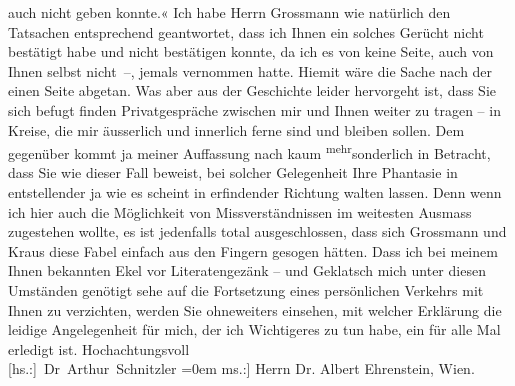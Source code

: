 \begin{ledgroupsized}[t]{13cm}
               auch nicht geben konnte.\introOben{}«\introOben{}\pend
           \pstart
           Ich habe Herrn Grossmann wie natürlich den
               Tatsachen entsprechend geantwortet, dass ich Ihnen ein solches Gerücht nicht
               bestätigt habe und nicht bestätigen konnte, da ich es von keine Seite, auch von Ihnen
               selbst nicht –, jemals vernommen hatte. Hiemit wäre die Sache nach der einen Seite
               abgetan. Was aber aus der Geschichte leider hervorgeht ist, dass Sie sich befugt
               finden Privatge{\pb}spräche zwischen mir und Ihnen weiter zu tragen –
               in Kreise, die mir äusserlich und innerlich ferne sind und bleiben sollen. Dem
               gegenüber kommt ja meine\introOben{}r\introOben{} Auffassung \introOben{}nach\introOben{} kaum \substVorne{}\textsuperscript{mehr}\substDazwischen{}sonderlich\substHinten{} in Betracht, dass Sie wie dieser Fall beweist, bei solcher Gelegenheit Ihre
               Phantasie in entstellender ja wie es scheint in erfindender Richtung walten lassen.
               Denn wenn ich hier auch die Möglichkeit von Missverständnissen im weitesten Ausmass
               zugestehen wollte, es ist jedenfalls total ausgeschlossen, dass sich Grossmann und Kraus diese Fabel einfach aus den Fingern gesogen hätten. Dass ich bei
               meinem Ihnen bekannten Ekel vor Literatengezänk – und Geklatsch mich unter diesen
               Umständen genötigt sehe auf die Fortsetzung eines persönlichen Verkehrs mit Ihnen zu
               verzichten, werden Sie ohneweiters einsehen, mit welcher Erklärung die leidige
               Angelegenheit für mich, der ich Wichtigeres zu tun habe, ein für alle Mal erledigt
               ist.\pend
           \pstart
           Hochachtungsvoll{\\[\baselineskip]}\spacefill\mbox{{[}hs.:{]} Dr Arthur Schnitzler}\pend
           \leftskip=0em{}\pstart
           \noindent{}{[}ms.:{]} Herrn Dr. Albert Ehrenstein, Wien.\pend
           
         
         \endnumbering{}\end{ledgroupsized}  \newcommand{\dateiname}{L02008}\newcommand{\titel}{Arthur Schnitzler an Albert Ehrenstein, 9. 2. 1911}\newcommand{\editorInnen}{Martin Anton Müller und Gerd-Hermann Susen}
      